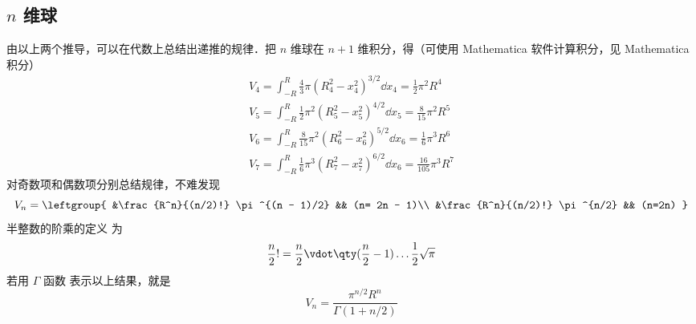 \subsection{ $n$ 维球}
由以上两个推导，可以在代数上总结出递推的规律．把 $n$ 维球在 $n+1$ 维积分，得（可使用  Mathematica 软件计算积分，见 Mathematica 积分）%
\begin{gather}
V_4 = \int_{-R}^R \frac43 \pi (R_4^2 - x_4^2)^{3/2} \dd{x_4}  = \frac12 \pi^2 R^4\\
V_5 = \int_{-R}^R \frac12 \pi^2 (R_5^2 - x_5^2)^{4/2} \dd{x_5}  = \frac{8}{15} \pi^2 R^5\\
V_6 = \int_{-R}^R \frac{8}{15} \pi ^2 (R_6^2 - x_6^2)^{5/2} \dd{x_6} = \frac16 \pi^3 R^6\\
V_7 = \int_{-R}^R \frac16 \pi^3 (R_7^2 - x_7^2)^{6/2} \dd{x_6} = \frac{16}{105} \pi^3 R^7
\end{gather}
对奇数项和偶数项分别总结规律，不难发现
\begin{equation}
V_n = \leftgroup{
&\frac{R^n}{(n/2)!} \pi ^{(n - 1)/2} && (n= 2n - 1)\\
&\frac{R^n}{(n/2)!} \pi ^{n/2} && (n=2n)
}\end{equation}
半整数的阶乘的定义 为
\begin{equation}
\frac{n}{2}! = \frac{n}{2} \vdot \qty(\frac{n}{2}-1) \dots \frac12 \sqrt{\pi}
\end{equation}
若用 $\Gamma $ 函数 表示以上结果，就是
\begin{equation}
V_n = \frac{\pi^{n/2}{R^n}}{\Gamma (1 + n/2)}
\end{equation}








